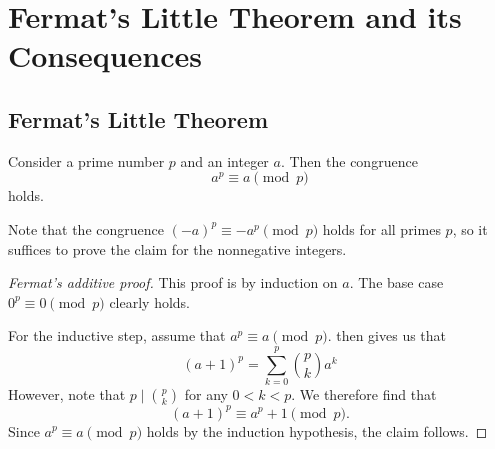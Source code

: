 \chapter{Fermat's Little Theorem and its Consequences}\label{chapter:modular-arithmetic}

\section{Fermat's Little Theorem}

\begin{theorem}\label{theorem:fermats-little-theorem}
  Consider a prime number $p$ and an integer $a$. Then the congruence
  \begin{equation*}
    a^{p}\equiv a\pmod{p}
  \end{equation*}
  holds.
\end{theorem}

\begin{remark}
  Note that the congruence $(-a)^p\equiv -a^p\pmod{p}$ holds for all primes $p$, so it suffices to prove the claim for the nonnegative integers.
\end{remark}

\begin{proof}[Fermat's additive proof]
  This proof is by induction on $a$. The base case $0^p\equiv 0\pmod{p}$ clearly holds.

  For the inductive step, assume that $a^p\equiv a\pmod{p}$.  then gives us that
  \begin{equation*}
    (a+1)^p=\sum_{k=0}^p \binom{p}{k}a^k
  \end{equation*}
  However, note that $p\mid\binom{p}{k}$ for any $0<k<p$. We therefore find that
  \begin{equation*}
    (a+1)^p\equiv a^p+1\pmod{p}.
  \end{equation*}
  Since $a^p\equiv a\pmod{p}$ holds by the induction hypothesis, the claim follows.
\end{proof}

